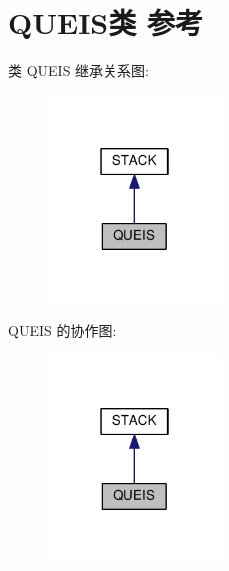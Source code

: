 \hypertarget{classQUEIS}{}\section{Q\+U\+E\+I\+S类 参考}
\label{classQUEIS}


类 Q\+U\+E\+IS 继承关系图\+:
\nopagebreak
\begin{figure}[H]
\begin{center}
\leavevmode
\includegraphics[width=130pt]{classQUEIS__inherit__graph}
\end{center}
\end{figure}


Q\+U\+E\+IS 的协作图\+:
\nopagebreak
\begin{figure}[H]
\begin{center}
\leavevmode
\includegraphics[width=130pt]{classQUEIS__coll__graph}
\end{center}
\end{figure}
